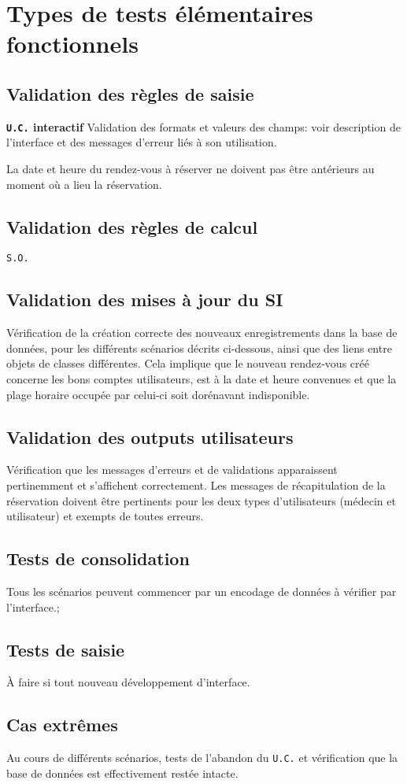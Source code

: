 	\section{Types de tests élémentaires fonctionnels}
	\subsection{Validation des règles de saisie}
	\textbf{\texttt{U.C.} interactif}
	Validation des formats et valeurs des champs: voir description de l'interface et
	des messages d’erreur liés à son utilisation.

	La date et heure du rendez-vous à réserver ne doivent pas être antérieurs au
	moment où a lieu la réservation. 
	\subsection{Validation des règles de calcul}
	\texttt{S.O.}
	\subsection{Validation des mises à jour du SI}
	Vérification de la création correcte des nouveaux enregistrements dans la base
	de données, pour les différents scénarios décrits ci-dessous, ainsi que des
	liens entre objets de classes différentes. 
	Cela implique que le nouveau rendez-vous créé concerne les bons comptes
	utilisateurs, est à la date et heure convenues et que la plage horaire occupée
	par celui-ci soit dorénavant indisponible.
	\subsection{Validation des outputs utilisateurs}
	Vérification que les messages d’erreurs et de validations apparaissent
	pertinemment et s’affichent correctement. Les messages de récapitulation de la
	réservation doivent être pertinents pour les deux types d’utilisateurs (médecin
	et utilisateur) et exempts de toutes erreurs.
	\subsection{Tests de consolidation}
	Tous les scénarios peuvent commencer par un encodage de données à 
	vérifier par l’interface.;
	\subsection{Tests de saisie}
	À faire si tout nouveau développement d’interface.
	\subsection{Cas extrêmes}
	Au cours de différents scénarios, tests de l'abandon du \texttt{U.C.} et vérification que
	la base de données est effectivement restée intacte.
